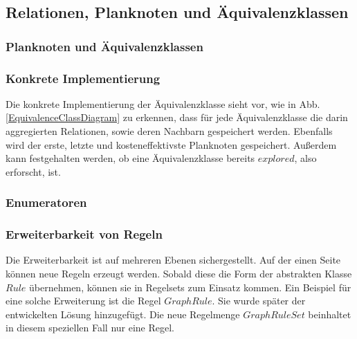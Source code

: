 \subsection{Relationen, Planknoten und Äquivalenzklassen}




\subsubsection{Planknoten und Äquivalenzklassen}




\subsubsection{Konkrete Implementierung}

Die konkrete Implementierung der Äquivalenzklasse sieht vor, wie in Abb. \ref{EquivalenceClassDiagram} zu erkennen, dass für jede Äquivalenzklasse die darin aggregierten Relationen, sowie deren Nachbarn gespeichert werden. Ebenfalls wird der erste, letzte und kosteneffektivste Planknoten gespeichert. Außerdem kann festgehalten werden, ob eine Äquivalenzklasse bereits $explored$, also erforscht, ist. 






\subsubsection{Enumeratoren}





















\subsubsection{Erweiterbarkeit von Regeln}

Die Erweiterbarkeit ist auf mehreren Ebenen sichergestellt. Auf der einen Seite können neue Regeln erzeugt werden. Sobald diese die Form der abstrakten Klasse $Rule$ übernehmen, können sie in Regelsets zum Einsatz kommen. Ein Beispiel für eine solche Erweiterung ist die Regel $GraphRule$. Sie wurde später der entwickelten Lösung hinzugefügt. Die neue Regelmenge $GraphRuleSet$ beinhaltet in diesem speziellen Fall nur eine Regel.

